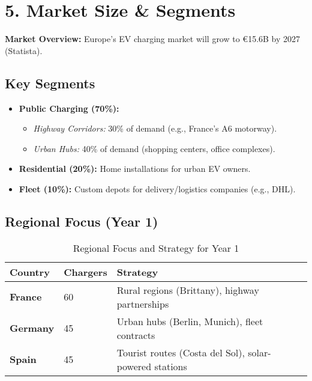 
\section{5. Market Size \& Segments}
\textbf{Market Overview:}  
Europe’s EV charging market will grow to €15.6B by 2027 (Statista).

\subsection*{Key Segments}
\begin{itemize}
    \item\textbf{Public Charging (70\%):}
    \begin{itemize}
        \item\textit{Highway Corridors:} 30\% of demand (e.g., France’s A6 motorway).
        \item \textit{Urban Hubs:} 40\% of demand (shopping centers, office complexes).
    \end{itemize}
    \item \textbf{Residential (20\%):} Home installations for urban EV owners.
    \item \textbf{Fleet (10\%):} Custom depots for delivery/logistics companies (e.g., DHL).
\end{itemize}
\subsection*{Regional Focus (Year 1)}
\begin{table}[h!]
    \centering
    \renewcommand{\arraystretch}{1.5}
    \begin{tabular}{|>{\bfseries}m{}|m{}|m{}|}
    \hline
    \textbf{Country} & \textbf{Chargers} & \textbf{Strategy} \\
    \hline
    France & 60 & Rural regions (Brittany), highway partnerships \\
    \hline
    Germany & 45 & Urban hubs (Berlin, Munich), fleet contracts \\
    \hline
    Spain & 45 & Tourist routes (Costa del Sol), solar-powered stations \\
    \hline
    \end{tabular}
    \caption{Regional Focus and Strategy for Year 1}
\end{table}
